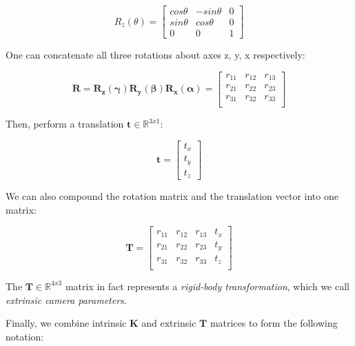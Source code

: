 \documentclass[a4paper]{report}
\numberwithin{figure}{section}
\newcommand{\R}{\mathbb{R}}
\begin{document}
\begin{equation}
  R_z(\theta) = 
  \begin{bmatrix}
    cos\theta & -sin\theta & 0\\
    sin\theta & cos\theta & 0\\
    0 & 0 & 1
  \end{bmatrix}
\end{equation} \label{eq:rot_matrx_z}

One can concatenate all three rotations about axes z, y, x respectively:

\begin{equation}
  \mathbf{R} = \mathbf{R_z(\gamma)}\mathbf{R_y(\beta)}\mathbf{R_x(\alpha)}
  =
  \begin{bmatrix}
    r_{11} & r_{12} & r_{13}\\
    r_{21} & r_{22} & r_{23}\\
    r_{31} & r_{32} & r_{33}\\
  \end{bmatrix}
\end{equation} \label{eq:rot_matrix_derivation}

Then, perform a translation $\mathbf{t} \in \R^{3x1}$:

\begin{equation}
  \mathbf{t} = 
  \begin{bmatrix}
    t_x \\ t_y \\ t_z
  \end{bmatrix}
\end{equation} \label{eq:translation}

We can also compound the rotation matrix and the translation vector into 
one matrix:

\begin{equation}
  \mathbf{T} =
  \begin{bmatrix}
    r_{11} & r_{12} & r_{13} & t_x\\
    r_{21} & r_{22} & r_{23} & t_y\\
    r_{31} & r_{32} & r_{33} & t_z\\
  \end{bmatrix}
\end{equation} \label{eq:transformation_matrix}

The $\mathbf{T} \in \R^{4x3}$ matrix in fact represents 
a \textit{rigid-body transformation}, which we call 
\textit{extrinsic camera parameters}.

Finally, we combine intrinsic $\mathbf{K}$ and 
extrinsic $\mathbf{T}$ matrices to form the following notation: 
\end{document}
